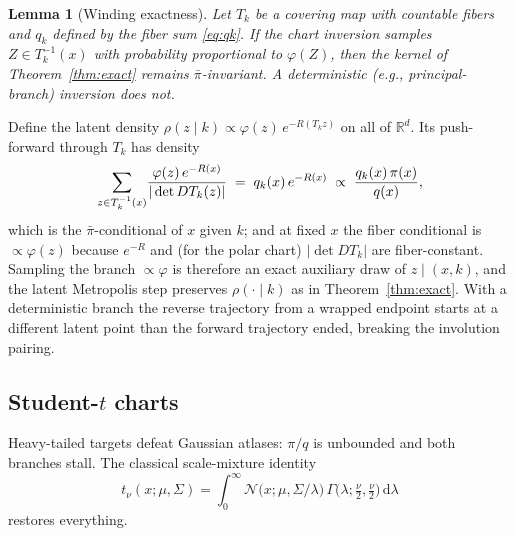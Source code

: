 \documentclass[10pt,journal,compsoc]{IEEEtran}
\newtheorem{lemma}{Lemma}
\newcommand{\R}{\mathbb{R}}
\newcommand{\dd}{\mathrm{d}}
\begin{document}
\begin{lemma}[Winding exactness]\label{lem:winding}
Let $T_k$ be a covering map with countable fibers and $q_k$ defined by the
fiber sum \eqref{eq:qk}. If the chart inversion samples
$Z\in T_k^{-1}(x)$ with probability proportional to $\varphi(Z)$, then the
kernel of Theorem~\ref{thm:exact} remains $\bar\pi$-invariant. A
deterministic (e.g., principal-branch) inversion does not.
\end{lemma}
\begin{IEEEproof}
Define the latent density $\rho(z\mid k)\propto\varphi(z)\,e^{-R(T_kz)}$ on
all of $\R^d$. Its push-forward through $T_k$ has density
\begin{align}
\sum_{z\in T_k^{-1}(x)}\!\frac{\varphi(z)\,e^{-R(x)}}{|\det DT_k(z)|}
\;=\;q_k(x)\,e^{-R(x)}
\;\propto\;\frac{q_k(x)\,\pi(x)}{q(x)},\notag
\end{align}
which is the $\bar\pi$-conditional of $x$ given $k$; and at fixed $x$ the
fiber conditional is $\propto\varphi(z)$ because $e^{-R}$ and (for the
polar chart) $|\det DT_k|$ are fiber-constant. Sampling the branch
$\propto\varphi$ is therefore an exact auxiliary draw of $z\mid(x,k)$, and
the latent Metropolis step preserves $\rho(\cdot\mid k)$ as in
Theorem~\ref{thm:exact}. With a deterministic branch the reverse trajectory
from a wrapped endpoint starts at a different latent point than the forward
trajectory ended, breaking the involution pairing.
\end{IEEEproof}

\subsection{Student-$t$ charts}\label{sec:tcharts}
Heavy-tailed targets defeat Gaussian atlases: $\pi/q$ is unbounded and
both branches stall. The classical scale-mixture identity
\begin{equation}
t_\nu(x;\mu,\Sigma)=\int_0^\infty
\mathcal N\!\bigl(x;\mu,\Sigma/\lambda\bigr)\,
\Gamma\!\bigl(\lambda;\tfrac\nu2,\tfrac\nu2\bigr)\,\dd\lambda
\label{eq:scalemix}
\end{equation}
restores everything.
\end{document}

